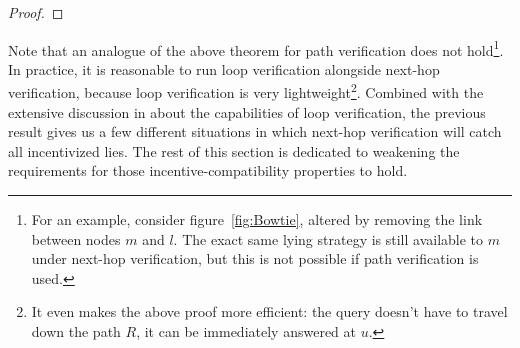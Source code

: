 \documentclass[pdftex,twoside,twocolumn,10pt,letterpaper]{article}
\begin{document}
\begin{proof}


  \end{proof}
  Note that an analogue of the above theorem for path
  verification does not hold\footnote{
    For an example, consider figure~\ref{fig:Bowtie}, altered by removing the
    link between nodes $m$ and $l$. The exact same lying strategy is still
    available to $m$ under next-hop verification, but this is not possible if
    path verification is used.
  }.
  In practice, it is reasonable to run loop verification alongside next-hop
  verification, because loop verification is very lightweight\footnote{
    It even makes the above proof more efficient: the query doesn't have to
    travel down the path $R$, it can be immediately answered at $u$.
  }.
  Combined with the extensive discussion in \cite{Attraction} about the 
  capabilities of loop verification,
  the previous result gives us a few different situations in which
  next-hop verification will catch all incentivized lies.
  The rest of this section is dedicated to weakening the requirements
  for those incentive-compatibility properties to hold.
\end{document}
